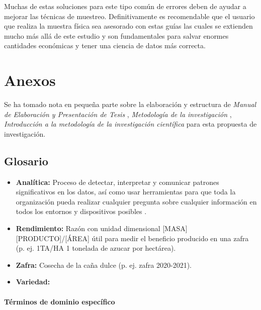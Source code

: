 \documentclass{report}
\begin{document}
Muchas de estas soluciones para este tipo común de errores deben de ayudar a mejorar las técnicas de muestreo. Definitivamente es recomendable que el usuario que realiza la muestra física sea asesorado con estas guías las cuales se extienden mucho más allá de este estudio y son fundamentales para salvar enormes cantidades económicas y tener una ciencia de datos más correcta.

\chapter{Anexos}

Se ha tomado nota en pequeña parte sobre la elaboración y estructura de \textit{Manual de Elaboración y Presentación de Tesis} \cite{universidad-san-carlos-2016}, \textit{Metodología de la investigación} \cite{collado-2014}, \textit{Introducción a la metodología de la investigación científica} \cite{cabezas-2018} para esta propuesta de investigación.

\section{Glosario}

\begin{itemize}
    \item \textbf{Analítica:} Proceso de detectar, interpretar y comunicar patrones significativos en los datos, así como usar herramientas para que toda la organización pueda realizar cualquier pregunta sobre cualquier información en todos los entornos y dispositivos posibles \cite{oracle-2021}.
    
    \item \textbf{Rendimiento:} Razón con unidad dimensional [MASA][PRODUCTO]/[ÁREA] útil para medir el beneficio producido en una zafra (p. ej. 1TA/HA 1 tonelada de azucar por hectárea).
    
    \item \textbf{Zafra:} Cosecha de la caña dulce (p. ej. zafra 2020-2021).
    
    \item \textbf{Variedad:} 
\end{itemize}

\subsubsection{Términos de dominio específico}
\end{document}
